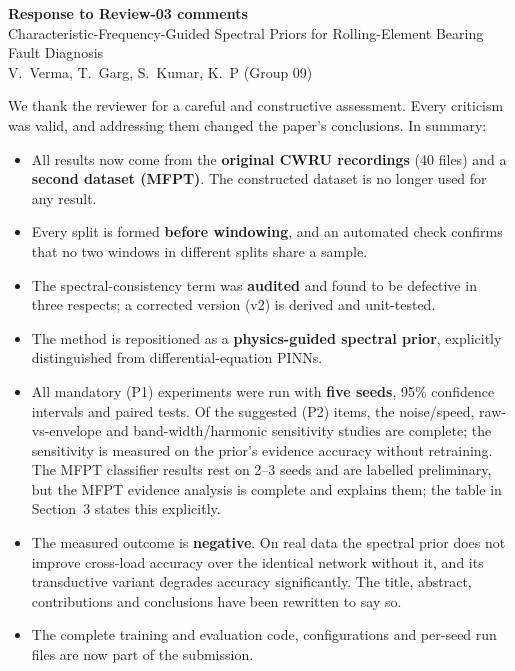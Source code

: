 \documentclass[11pt]{article}
\begin{document}
\begin{center}
{\Large\bfseries Response to Review-03 comments}\\[4pt]
Characteristic-Frequency-Guided Spectral Priors for Rolling-Element Bearing Fault Diagnosis\\
V.~Verma, T.~Garg, S.~Kumar, K.~P (Group 09)
\end{center}

We thank the reviewer for a careful and constructive assessment. Every
criticism was valid, and addressing them changed the paper's conclusions. In
summary:
\begin{itemize}[leftmargin=*]
\item All results now come from the \textbf{original CWRU recordings} (40 files)
and a \textbf{second dataset (MFPT)}. The constructed dataset is no longer used
for any result.
\item Every split is formed \textbf{before windowing}, and an automated check
confirms that no two windows in different splits share a sample.
\item The spectral-consistency term was \textbf{audited} and found to be defective
in three respects; a corrected version (v2) is derived and unit-tested.
\item The method is repositioned as a \textbf{physics-guided spectral prior},
explicitly distinguished from differential-equation PINNs.
\item All mandatory (P1) experiments were run with \textbf{five seeds}, 95\%
confidence intervals and paired tests. Of the suggested (P2) items, the
noise/speed, raw-vs-envelope and band-width/harmonic sensitivity studies are
complete; the sensitivity is measured on the prior's evidence accuracy without
retraining. The MFPT classifier results rest on 2--3 seeds and are labelled
preliminary, but the MFPT evidence analysis is complete and explains them;
the table in Section~3 states this explicitly.
\item The measured outcome is \textbf{negative}. On real data the spectral prior
does not improve cross-load accuracy over the identical network without it, and
its transductive variant degrades accuracy significantly. The title, abstract,
contributions and conclusions have been rewritten to say so.
\item The complete training and evaluation code, configurations and per-seed run
files are now part of the submission.
\end{itemize}

\end{document}
